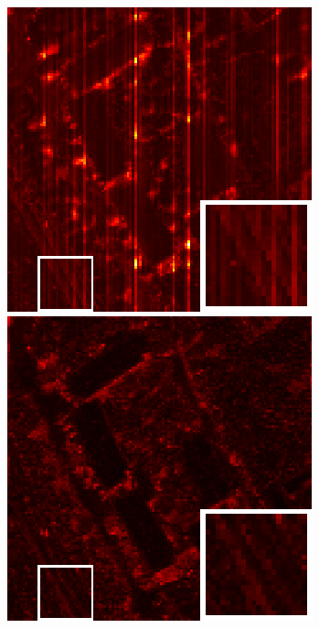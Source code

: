 \begin{figure}[t]
\begin{center}
\begin{minipage}{0.15\hsize}
		\end{minipage}
		\begin{minipage}{0.15\hsize}
			\centerline{\includegraphics[width=\hsize]{./fig_supplement/SAM_map_color_woboundary/PaviaU120/sam_map_FastHyMix.eps}} %
		\end{minipage}
		\begin{minipage}{0.15\hsize}
			\centerline{\includegraphics[width=\hsize]{./fig_supplement/SAM_map_color_woboundary/PaviaU120/sam_map_S3TTV.eps}} %
		\end{minipage}
		\begin{minipage}{0.050\hsize}
			\centerline{\hspace{\hsize}} %
		\end{minipage}
		

\end{center}
\end{figure}
